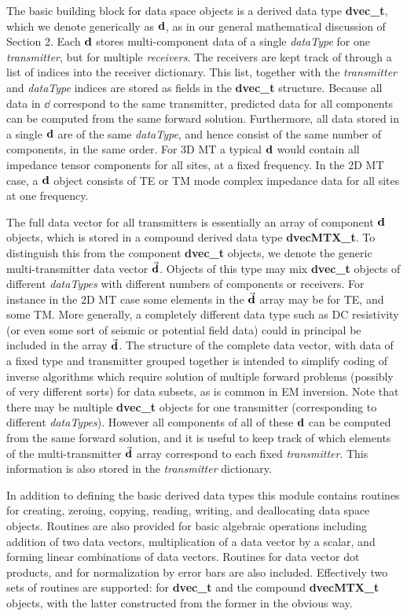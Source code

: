 The basic building block for data space objects is
a derived data type {\bf dvec\_t}, which we denote generically
as ${\bf d}$, as in our general mathematical discussion of Section 2.
Each ${\bf d}$ stores multi-component data of a single {\it dataType}
for one {\it transmitter}, but for multiple {\it receivers}.
The receivers are kept track of through a list
of indices into the receiver dictionary.
This list, together with the {\it transmitter} and {\it dataType}
indices are stored as fields in the {\bf dvec\_t} structure.
Because all data in $\dd$ correspond to the same transmitter,
predicted data for all components
can be computed from the same forward solution.
Furthermore, all data stored in a single ${\bf d}$
are of the same {\it dataType}, and hence consist of the same number
of components, in the same order.
For 3D MT a typical ${\bf d}$ would contain all impedance
tensor components for all sites, at a fixed frequency.  In 
the 2D MT case, a ${\bf d}$ object consists of
TE or TM mode complex impedance data for all sites at one frequency.

The full data vector for all transmitters
is essentially an array of component ${\bf d}$
objects, which is stored in a compound derived data type 
{\bf dvecMTX\_t}.  To distinguish this from the
component {\bf dvec\_t} objects, we denote the
generic multi-transmitter data vector $\vec{\bf d}$.
Objects of this type may mix {\bf dvec\_t}
objects of different {\it dataTypes}
with different numbers of components or receivers.  
For instance in the 2D MT case some 
elements in the $\vec{\bf d}$ array may be for TE, and some TM.
More generally, a completely different data type
such as DC resistivity (or even some sort of seismic
or potential field data) could in principal 
be included in the array $\vec{\bf d}$.
The structure of the complete data vector, with
data of a fixed type and transmitter grouped together
is intended to simplify coding of inverse algorithms which require
solution of multiple forward problems (possibly of very different
sorts) for data subsets, as is common in EM inversion.
Note that there may be multiple {\bf dvec\_t} objects for one transmitter
(corresponding to different {\em dataTypes}).
However all components of all of these ${\bf d}$ can be computed from the same 
forward solution, and it is useful to keep track
of which elements of the multi-transmitter
$\vec{\bf d}$ array correspond to each fixed
{\em transmitter}.  This information is also stored in the
{\em transmitter} dictionary.

In addition to defining the basic derived data types 
this module contains routines for
creating, zeroing, copying, reading, writing, and deallocating 
data space objects.  Routines are also
provided for basic algebraic operations
including addition of two data vectors, multiplication of a data
vector by a scalar, and forming linear combinations of data vectors.
Routines for data vector dot products, and for normalization
by error bars are also included.  
Effectively two sets of routines are supported: for
{\bf dvec\_t} and the compound {\bf dvecMTX\_t} objects,
with the latter constructed from the former in the obvious way.


